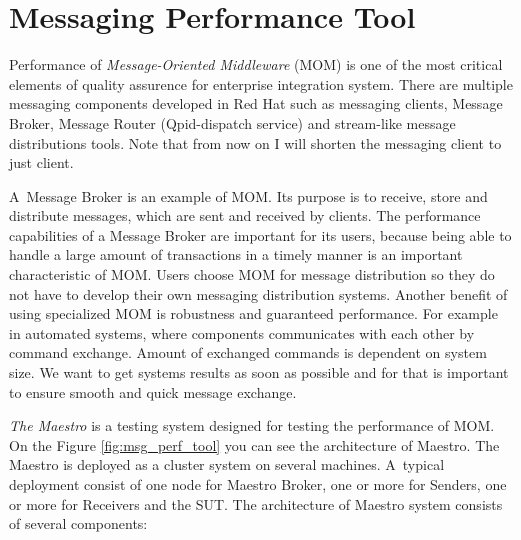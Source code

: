 
\chapter{Messaging Performance Tool}
\label{Messaging Performance Tool}
Performance of \emph{Message-Oriented Middleware} (MOM) \cite{CURRY:MOM} is one of the most critical elements of quality assurence for enterprise integration system. There are multiple messaging components developed in Red Hat such as messaging clients, Message Broker, Message Router (Qpid-dispatch service) and stream-like message distributions tools. Note that from now on I will shorten the messaging client to just client.

A~Message Broker is an example of MOM. Its purpose is to receive, store and distribute messages, which are sent and received by clients. The performance capabilities of a Message Broker are important for its users, because being able to handle a large amount of transactions in a timely manner is an important characteristic of MOM. Users choose MOM for message distribution so they do not have to develop their own messaging distribution systems. Another benefit of using specialized MOM is robustness and guaranteed performance. For example in automated systems, where components communicates with each other by command exchange. Amount of exchanged commands is dependent on system size. We want to get systems results as soon as possible and for that is important to ensure smooth and quick message exchange.

\emph{The Maestro} \cite{ORPISKE:MSGPT} is a testing system designed for testing the performance of MOM. On the Figure \ref{fig:msg_perf_tool} you can see the architecture of Maestro. The Maestro is deployed as a cluster system on several machines. A~typical deployment consist of one node for Maestro Broker, one or more for Senders, one or more for Receivers and the SUT. The architecture of Maestro system consists of several components:


